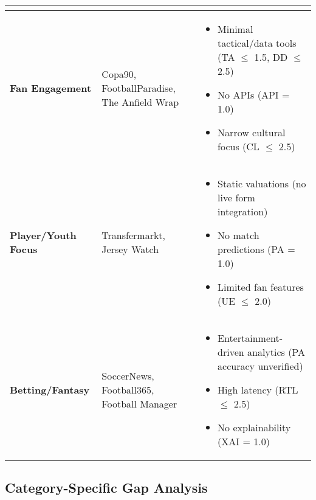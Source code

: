 \begin{table}[h!]
\begin{tabularx}{\textwidth}{|>{\raggedright\arraybackslash}p{2.5cm}|>{\raggedright\arraybackslash}p{3.5cm}|X|}
\begin{itemize}
        \end{itemize} \\
        \hline
        \textbf{Fan Engagement} & Copa90, FootballParadise, The Anfield Wrap & 
        \begin{itemize}
            \item Minimal tactical/data tools (TA $\leq$ 1.5, DD $\leq$ 2.5)
            \item No APIs (API = 1.0)
            \item Narrow cultural focus (CL $\leq$ 2.5)
        \end{itemize} \\
        \hline
        \textbf{Player/Youth Focus} & Transfermarkt, Jersey Watch & 
        \begin{itemize}
            \item Static valuations (no live form integration)
            \item No match predictions (PA = 1.0)
            \item Limited fan features (UE $\leq$ 2.0)
        \end{itemize} \\
        \hline
        \textbf{Betting/Fantasy} & SoccerNews, Football365, Football Manager & 
        \begin{itemize}
            \item Entertainment-driven analytics (PA accuracy unverified)
            \item High latency (RTL $\leq$ 2.5)
            \item No explainability (XAI = 1.0)
        \end{itemize} \\
        \hline
    \end{tabularx}
\end{table}

\subsection{Category-Specific Gap Analysis}


